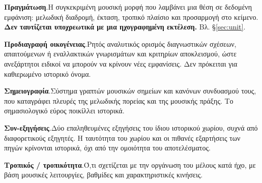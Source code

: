 \documentclass[a4paper]{article}
\newcommand{\glossterm}[3]{\par\noindent\hypertarget{gl:#1}{\textbf{#2}.}\enspace #3\par}
\begin{document}
\glossterm{realization}{Πραγμάτωση}{Η συγκεκριμένη μουσική μορφή που λαμβάνει μια θέση σε δεδομένη εμφάνιση: μελωδική διαδρομή, έκταση, τροπικό πλαίσιο και προσαρμογή στο κείμενο. \textbf{Δεν ταυτίζεται υποχρεωτικά με μια ηχογραφημένη εκτέλεση.} Βλ. §\ref{sec:unit}.}
\glossterm{spec}{Προδιαγραφή οικογένειας}{Ρητός αναλυτικός ορισμός διαγνωστικών σχέσεων, απαιτούμενων ή εναλλακτικών γνωρισμάτων και κριτηρίων αποκλεισμού, ώστε ανεξάρτητοι ειδικοί να μπορούν να κρίνουν νέες εμφανίσεις. Δεν πρόκειται για καθιερωμένο ιστορικό όνομα.}
\glossterm{notation}{Σημειογραφία}{Σύστημα γραπτών μουσικών σημείων και κανόνων συνδυασμού τους, που καταγράφει πλευρές της μελωδικής πορείας και της μουσικής πράξης. Το σημασιολογικό εύρος ποικίλλει ιστορικά.}
\glossterm{coexegesis}{Συν-εξηγήσεις}{Δύο επαληθευμένες εξηγήσεις του ίδιου ιστορικού χωρίου, συχνά από διαφορετικούς εξηγητές. Η ταυτότητα του χωρίου και οι πιθανές εξαρτήσεις των πηγών κρίνονται ιστορικά, όχι από την ομοιότητα του αποτελέσματος.}
\glossterm{modal}{Τροπικός / τροπικότητα}{Ό,τι σχετίζεται με την οργάνωση του μέλους κατά ήχο, με βάση μουσικές λειτουργίες, βαθμίδες και χαρακτηριστικές κινήσεις.}
\endgroup
\end{document}
